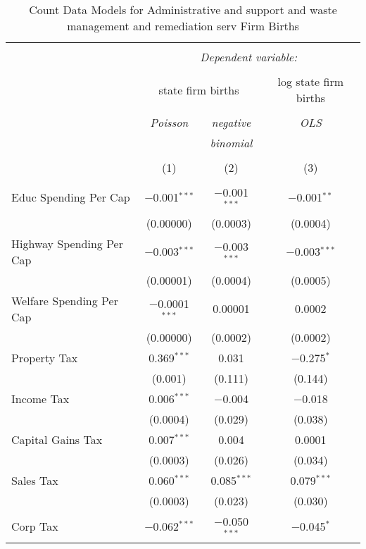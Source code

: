 
\begin{table}[!htbp] \centering 
  \caption{Count Data Models for Administrative and support and waste management and remediation serv Firm Births} 
  \label{} 
\begin{tabular}{@{\extracolsep{5pt}}lccc} 
\\[-1.8ex]\hline 
\hline \\[-1.8ex] 
 & \multicolumn{3}{c}{\textit{Dependent variable:}} \\ 
\cline{2-4} 
\\[-1.8ex] & \multicolumn{2}{c}{state firm births} & log state firm births \\ 
\\[-1.8ex] & \textit{Poisson} & \textit{negative} & \textit{OLS} \\ 
 & \textit{} & \textit{binomial} & \textit{} \\ 
\\[-1.8ex] & (1) & (2) & (3)\\ 
\hline \\[-1.8ex] 
 Educ Spending Per Cap & $-$0.001$^{***}$ & $-$0.001$^{***}$ & $-$0.001$^{**}$ \\ 
  & (0.00000) & (0.0003) & (0.0004) \\ 
  Highway Spending Per Cap  & $-$0.003$^{***}$ & $-$0.003$^{***}$ & $-$0.003$^{***}$ \\ 
  & (0.00001) & (0.0004) & (0.0005) \\ 
  Welfare Spending Per Cap  & $-$0.0001$^{***}$ & 0.00001 & 0.0002 \\ 
  & (0.00000) & (0.0002) & (0.0002) \\ 
  Property Tax & 0.369$^{***}$ & 0.031 & $-$0.275$^{*}$ \\ 
  & (0.001) & (0.111) & (0.144) \\ 
  Income Tax & 0.006$^{***}$ & $-$0.004 & $-$0.018 \\ 
  & (0.0004) & (0.029) & (0.038) \\ 
  Capital Gains Tax & 0.007$^{***}$ & 0.004 & 0.0001 \\ 
  & (0.0003) & (0.026) & (0.034) \\ 
  Sales Tax & 0.060$^{***}$ & 0.085$^{***}$ & 0.079$^{***}$ \\ 
  & (0.0003) & (0.023) & (0.030) \\ 
  Corp Tax & $-$0.062$^{***}$ & $-$0.050$^{***}$ & $-$0.045$^{*}$ \\ 

\end{tabular}
\end{table}
